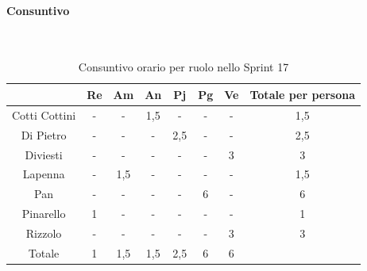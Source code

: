 \documentclass{article}
\begin{document}
            \paragraph{Consuntivo}\mbox{}\\
            \begin{table}[H]
                \centering
                \begin{tabular}{|c|c|c|c|c|c|c|c|}
                \hline
                              & Re  & Am  & An  & Pj  & Pg  & Ve  & Totale per persona \\ \hline
                Cotti Cottini & -   & -   & 1,5 & -   & -   & -   & 1,5                \\ \hline
                Di Pietro     & -   & -   & -   & 2,5 & -   & -   & 2,5                \\ \hline
                Diviesti      & -   & -   & -   & -   & -   & 3   & 3                  \\ \hline
                Lapenna       & -   & 1,5 & -   & -   & -   & -   & 1,5                \\ \hline
                Pan           & -   & -   & -   & -   & 6   & -   & 6                  \\ \hline
                Pinarello     & 1   & -   & -   & -   & -   & -   & 1                  \\ \hline
                Rizzolo       & -   & -   & -   & -   & -   & 3   & 3                  \\ \hline
                Totale        & 1   & 1,5 & 1,5 & 2,5 & 6   & 6   &                    \\ \hline
                \end{tabular}
                \caption{Consuntivo orario per ruolo nello Sprint 17}
            \end{table}

\end{document}

